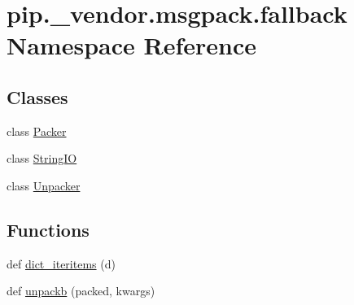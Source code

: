 \hypertarget{namespacepip_1_1__vendor_1_1msgpack_1_1fallback}{}\section{pip.\+\_\+vendor.\+msgpack.\+fallback Namespace Reference}
\label{namespacepip_1_1__vendor_1_1msgpack_1_1fallback}
\subsection*{Classes}
\begin{DoxyCompactItemize}
\item 
class \hyperlink{classpip_1_1__vendor_1_1msgpack_1_1fallback_1_1Packer}{Packer}
\item 
class \hyperlink{classpip_1_1__vendor_1_1msgpack_1_1fallback_1_1StringIO}{String\+IO}
\item 
class \hyperlink{classpip_1_1__vendor_1_1msgpack_1_1fallback_1_1Unpacker}{Unpacker}
\end{DoxyCompactItemize}
\subsection*{Functions}
\begin{DoxyCompactItemize}
\item 
def \hyperlink{namespacepip_1_1__vendor_1_1msgpack_1_1fallback_a9a5cef9c31f40b81a8334d42e16be800}{dict\+\_\+iteritems} (d)
\item 
def \hyperlink{namespacepip_1_1__vendor_1_1msgpack_1_1fallback_a2ca688f971abac3df19ee9f659013997}{unpackb} (packed, kwargs)
\end{DoxyCompactItemize}
